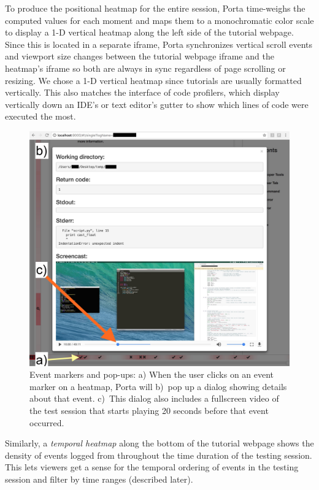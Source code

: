 To produce the positional heatmap for the entire session, Porta time-weighs the
computed values for each moment and maps them to a monochromatic
color scale to display a 1-D vertical heatmap along the
left side of the tutorial webpage. Since this is located in a separate
iframe, Porta synchronizes vertical scroll events and viewport size
changes between the tutorial webpage iframe and the heatmap's iframe so
both are always in sync regardless of page scrolling or resizing.
%
We chose a 1-D vertical heatmap since tutorials are usually formatted
vertically. This also matches the interface of code profilers, which
display vertically down an IDE's or text editor's gutter to show which
lines of code were executed the most.


\begin{figure}
  \includegraphics[width=0.95\columnwidth]{figures/porta/popup.jpg}

  \caption{Event markers and pop-ups: a) When the user clicks on an
  event marker on a heatmap, Porta will b)~pop up a dialog showing
  details about that event. c)~This dialog also includes a fullscreen video
  of the test session that starts playing 20 seconds before that event
  occurred.}

  \label{fig:popup}
  \vspace{-0.5em} %
\end{figure}


Similarly, a \emph{temporal heatmap} along the bottom of the
tutorial webpage shows the density of events
logged from  throughout the time duration of the
testing session. This lets viewers get a sense for the temporal ordering
of events in the testing session and filter by time ranges (described later).

